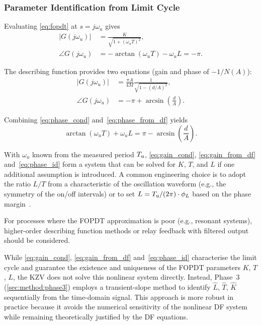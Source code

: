 \subsubsection{Parameter Identification from Limit Cycle}

Evaluating \eqref{eq:fopdt} at $s = j\omega_u$ gives
\begin{align}
    |G(j\omega_u)| &= \frac{K}{\sqrt{1 + (\omega_u T)^2}},
    \label{eq:gain_cond} \\
    \angle G(j\omega_u) &= -\arctan(\omega_u T) - \omega_u L = -\pi.
    \label{eq:phase_cond}
\end{align}

The describing function provides two equations (gain and phase of
$-1/N(A)$):
\begin{align}
    |G(j\omega_u)| &= \frac{\pi A}{4M}
                      \frac{1}{\sqrt{1 - (d/A)^2}},
    \label{eq:gain_from_df} \\
    \angle G(j\omega_u) &= -\pi + \arcsin\!\left(\frac{d}{A}\right).
    \label{eq:phase_from_df}
\end{align}

Combining \eqref{eq:phase_cond} and~\eqref{eq:phase_from_df} yields
\begin{equation}
    \arctan(\omega_u T) + \omega_u L
    = \pi - \arcsin\!\left(\frac{d}{A}\right).
    \label{eq:phase_id}
\end{equation}

With $\omega_u$ known from the measured period $T_{\mathrm{u}}$, \eqref{eq:gain_cond}, \eqref{eq:gain_from_df} and~\eqref{eq:phase_id}
form a system that can be solved for $K$, $T$, and $L$ if one additional
assumption is introduced.
A common engineering choice is to adopt the ratio $L/T$ from a
characteristic of the oscillation waveform (e.g., the symmetry of the
on/off intervals) or to set $L = T_{\mathrm{u}}/(2\pi) \cdot \phi_L$ based on the
phase margin~\cite{Seborg2011}.

\begin{remark}
    For processes where the FOPDT approximation is poor (e.g., resonant
    systems), higher-order describing function methods or relay feedback
    with filtered output should be considered.
\end{remark}

\begin{remark}
    While \eqref{eq:gain_cond}, \eqref{eq:gain_from_df} and~\eqref{eq:phase_id} characterise the
    limit cycle and guarantee the existence and uniqueness of the FOPDT
    parameters $K$, $T$, $L$, the KZV does not solve this nonlinear system
    directly. Instead, Phase~3 (\cref{sec:method:phase3}) employs a
    transient-slope method to identify $\hat{L}$, $\hat{T}$, $\hat{K}$
    sequentially from the time-domain signal. This approach is more robust
    in practice because it avoids the numerical sensitivity of the nonlinear
    DF system while remaining theoretically justified by the DF equations.
\end{remark}

